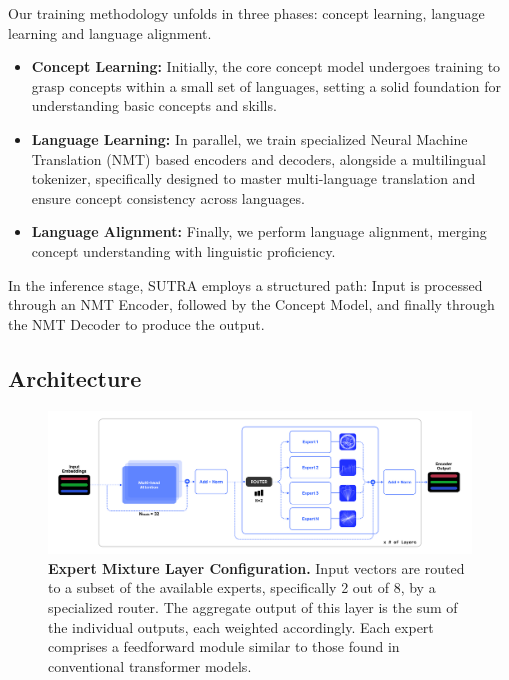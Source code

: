 \documentclass{article}
\begin{document}
Our training methodology unfolds in three phases: concept learning, language learning and language alignment. 
\begin{itemize}
\item \textbf{Concept Learning:} Initially, the core concept model undergoes training to grasp concepts within a small set of languages, setting a solid foundation for understanding basic concepts and skills. 
\item \textbf{Language Learning:} In parallel, we train specialized Neural Machine Translation (NMT) based encoders and decoders, alongside a multilingual tokenizer, specifically designed to master multi-language translation and ensure concept consistency across languages. 
\item \textbf{Language Alignment:} Finally, we perform language alignment, merging concept understanding with linguistic proficiency. 
\end{itemize}
In the inference stage, SUTRA employs a structured path: Input is processed through an NMT Encoder, followed by the Concept Model, and finally through the NMT Decoder to produce the output.

\subsection{Architecture}

\begin{figure}
\centering
\vspace{-12pt}
\includegraphics[width=1.0\linewidth,keepaspectratio]{images/sutra_architecture_small.png}
\caption{\small \textbf{Expert Mixture Layer Configuration.} Input vectors are routed to a subset of the available experts, specifically 2 out of 8, by a specialized router. The aggregate output of this layer is the sum of the individual outputs, each weighted accordingly. Each expert comprises a feedforward module similar to those found in conventional transformer models.}
\label{fig:expert_mixture}
\vspace{-2pt}
\end{figure}
\end{document}
